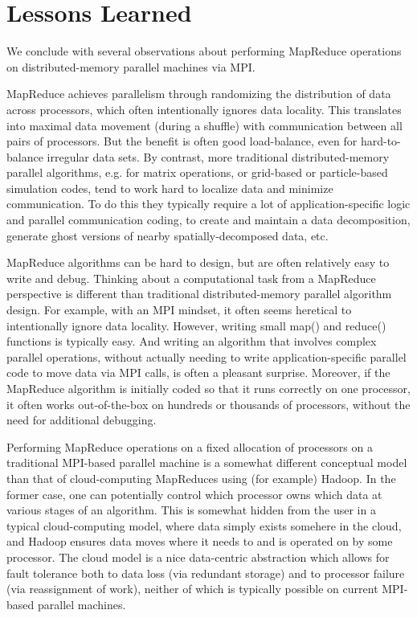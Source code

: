 \section{Lessons Learned}

We conclude with several observations about performing MapReduce
operations on distributed-memory parallel machines via MPI.

MapReduce achieves parallelism through randomizing the distribution of
data across processors, which often intentionally ignores data
locality.  This translates into maximal data movement (during a
shuffle) with communication between all pairs of processors.  But the
benefit is often good load-balance, even for hard-to-balance irregular
data sets.  By contrast, more traditional distributed-memory parallel
algorithms, e.g. for matrix operations, or grid-based or
particle-based simulation codes, tend to work hard to localize data
and minimize communication.  To do this they typically require a lot
of application-specific logic and parallel communication coding, to
create and maintain a data decomposition, generate ghost versions of
nearby spatially-decomposed data, etc.

MapReduce algorithms can be hard to design, but are often relatively
easy to write and debug.  Thinking about a computational task from a
MapReduce perspective is different than traditional distributed-memory
parallel algorithm design.  For example, with an MPI mindset, it often
seems heretical to intentionally ignore data locality.  However,
writing small map() and reduce() functions is typically easy.  And
writing an algorithm that involves complex parallel operations,
without actually needing to write application-specific parallel code
to move data via MPI calls, is often a pleasant surprise.  Moreover,
if the MapReduce algorithm is initially coded so that it runs
correctly on one processor, it often works out-of-the-box on hundreds
or thousands of processors, without the need for additional debugging.

Performing MapReduce operations on a fixed allocation of processors on
a traditional MPI-based parallel machine is a somewhat different
conceptual model than that of cloud-computing MapReduces using (for
example) Hadoop.  In the former case, one can potentially control
which processor owns which data at various stages of an algorithm.
This is somewhat hidden from the user in a typical cloud-computing
model, where data simply exists somehere in the cloud, and Hadoop
ensures data moves where it needs to and is operated on by some
processor.  The cloud model is a nice data-centric abstraction which
allows for fault tolerance both to data loss (via redundant storage)
and to processor failure (via reassignment of work), neither of which
is typically possible on current MPI-based parallel machines.

